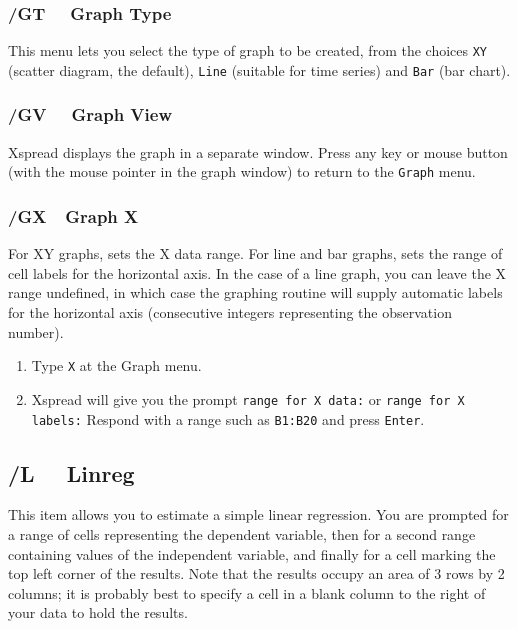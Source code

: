 \documentclass[titlepage]{article}
\begin{document}
\subsubsection{/GT \ \     Graph Type}

This menu lets you select the type of graph to be created, from the choices
\texttt{XY} (scatter diagram, the default), \texttt{Line} (suitable
for time series) and \texttt{Bar} (bar chart).  

\subsubsection{/GV \ \     Graph View}

\textsf{Xspread} displays the graph in a separate window.  Press any
key or mouse button (with the mouse pointer in the graph window) to
return to the \texttt{Graph} menu.

\subsubsection{/GX\ \      Graph X}

For XY graphs, sets the X data range.  For line and bar graphs, sets
the range of cell labels for the horizontal axis.  In the case of a
line graph, you can leave the X range undefined, in which case the
graphing routine will supply automatic labels for the horizontal axis
(consecutive integers representing the observation number).

\usage{}
\begin{enumerate}\itemsep -2pt
\item Type \texttt{X} at the Graph menu.
\item \textsf{Xspread} will give you the prompt
  {\tt range for X data:} or {\tt range for X labels:}
  Respond with a range such as \texttt{B1:B20} and press
  \texttt{Enter}.
\end{enumerate} 

\subsection[Linear Regression]{/L \ \      Linreg}

This item allows you to estimate a simple linear regression.  You are
prompted for a range of cells representing the dependent variable, 
then for a second range containing values of the independent variable,
and finally for a cell marking the top left corner of the results.
Note that the results occupy an area of 3 rows by 2 columns; it is
probably best to specify a cell in a blank column to the right of your
data to hold the results.
\end{document}
